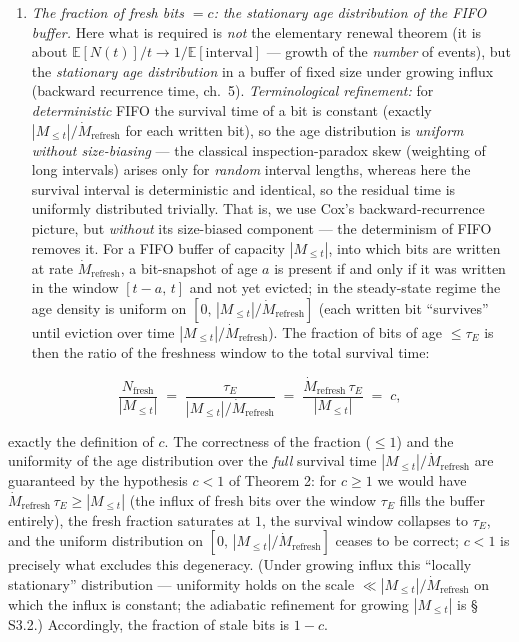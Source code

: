 \documentclass[12pt]{iopart}
\begin{document}
\begin{enumerate}
\item

  \emph{The fraction of fresh bits \(= c\): the stationary age distribution of the FIFO buffer.} Here what is required is \emph{not} the elementary renewal theorem (it is about \(\mathbb E[N(t)]/t \to 1/\mathbb E[\text{interval}]\) --- growth of the \emph{number} of events), but the \emph{stationary age distribution} in a buffer of fixed size under growing influx (backward recurrence time, \cite{Cox1962} ch.~5). \emph{Terminological refinement:} for \emph{deterministic} FIFO the survival time of a bit is constant (exactly \(|M_{\le t}|/\dot M_{\text{refresh}}\) for each written bit), so the age distribution is \emph{uniform without size-biasing} --- the classical inspection-paradox skew (weighting of long intervals) arises only for \emph{random} interval lengths, whereas here the survival interval is deterministic and identical, so the residual time is uniformly distributed trivially. That is, we use Cox's backward-recurrence picture, but \emph{without} its size-biased component --- the determinism of FIFO removes it. For a FIFO buffer of capacity \(|M_{\le t}|\), into which bits are written at rate \(\dot M_{\text{refresh}}\), a bit-snapshot of age \(a\) is present if and only if it was written in the window \([t-a,\,t]\) and not yet evicted; in the steady-state regime the age density is uniform on \([0,\,|M_{\le t}|/\dot M_{\text{refresh}}]\) (each written bit ``survives'' until eviction over time \(|M_{\le t}|/\dot M_{\text{refresh}}\)). The fraction of bits of age \(\le \tau_E\) is then the ratio of the freshness window to the total survival time:

\end{enumerate}



\begin{equation}\frac{N_{\text{fresh}}}{|M_{\le t}|} \;=\; \frac{\tau_E}{|M_{\le t}|/\dot M_{\text{refresh}}} \;=\; \frac{\dot M_{\text{refresh}}\,\tau_E}{|M_{\le t}|} \;=\; c, \tag{S2.2b}\end{equation}



exactly the definition of \(c\). The correctness of the fraction (\(\le 1\)) and the uniformity of the age distribution over the \emph{full} survival time \(|M_{\le t}|/\dot M_{\text{refresh}}\) are guaranteed by the hypothesis \(c < 1\) of Theorem 2: for \(c \ge 1\) we would have \(\dot M_{\text{refresh}}\,\tau_E \ge |M_{\le t}|\) (the influx of fresh bits over the window \(\tau_E\) fills the buffer entirely), the fresh fraction saturates at \(1\), the survival window collapses to \(\tau_E\), and the uniform distribution on \([0,\,|M_{\le t}|/\dot M_{\text{refresh}}]\) ceases to be correct; \(c < 1\) is precisely what excludes this degeneracy. (Under growing influx this ``locally stationary'' distribution --- uniformity holds on the scale \(\ll |M_{\le t}|/\dot M_{\text{refresh}}\) on which the influx is constant; the adiabatic refinement for growing \(|M_{\le t}|\) is § S3.2.) Accordingly, the fraction of stale bits is \(1-c\).
\end{document}
